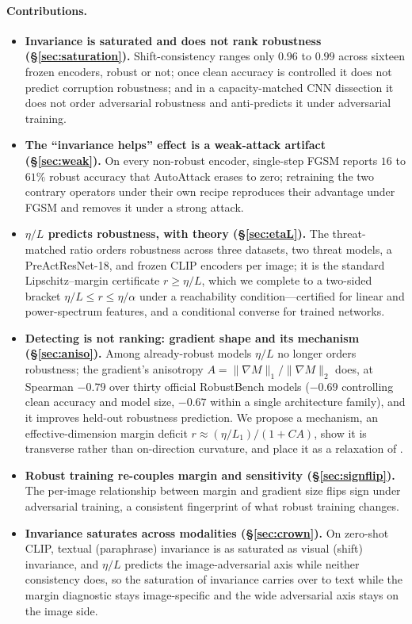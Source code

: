 \documentclass{article}
\theoremstyle{definition}
\newcommand{\etaL}{\eta/L}
\newcommand{\grad}{\nabla}
\begin{document}
\paragraph{Contributions.}
\begin{itemize}[leftmargin=1.2em,itemsep=2pt]
\item \textbf{Invariance is saturated and does not rank robustness (\S\ref{sec:saturation}).}
Shift-consistency ranges only $0.96$ to $0.99$ across sixteen frozen encoders, robust or not; once
clean accuracy is controlled it does not predict corruption robustness; and in a capacity-matched
CNN dissection it does not order adversarial robustness and anti-predicts it under adversarial training.
\item \textbf{The ``invariance helps'' effect is a weak-attack artifact (\S\ref{sec:weak}).} On every
non-robust encoder, single-step FGSM reports $16$ to $61\%$ robust accuracy that AutoAttack erases to
zero; retraining the two contrary operators under their own recipe reproduces their advantage under
FGSM and removes it under a strong attack.
\item \textbf{$\etaL$ predicts robustness, with theory (\S\ref{sec:etaL}).} The threat-matched ratio
orders robustness across three datasets, two threat models, a PreActResNet-18, and frozen CLIP encoders
per image; it is the standard Lipschitz--margin certificate $r\ge\etaL$, which we complete to a two-sided bracket
$\etaL\le r\le\eta/\alpha$ under a reachability condition---certified for linear and power-spectrum
features, and a conditional converse for trained networks.
\item \textbf{Detecting is not ranking: gradient shape and its mechanism (\S\ref{sec:aniso}).} Among
already-robust models $\etaL$ no longer orders robustness; the gradient's anisotropy
$A=\lVert\grad M\rVert_1/\lVert\grad M\rVert_2$ does, at Spearman $-0.79$ over thirty official RobustBench
models ($-0.69$ controlling clean accuracy and model size, $-0.67$ within a single architecture family),
and it improves held-out robustness prediction. We propose a mechanism, an effective-dimension margin
deficit $r\approx(\eta/L_1)/(1+CA)$, show it is transverse rather than on-direction curvature, and place
it as a relaxation of \citet{simongabriel2019adversarial}.
\item \textbf{Robust training re-couples margin and sensitivity (\S\ref{sec:signflip}).} The per-image
relationship between margin and gradient size flips sign under adversarial training, a consistent
fingerprint of what robust training changes.
\item \textbf{Invariance saturates across modalities (\S\ref{sec:crown}).} On zero-shot CLIP, textual
(paraphrase) invariance is as saturated as visual (shift) invariance, and $\etaL$ predicts the
image-adversarial axis while neither consistency does, so the saturation of invariance carries over to
text while the margin diagnostic stays image-specific and the wide adversarial axis stays on the image side.
\end{itemize}
\end{document}
